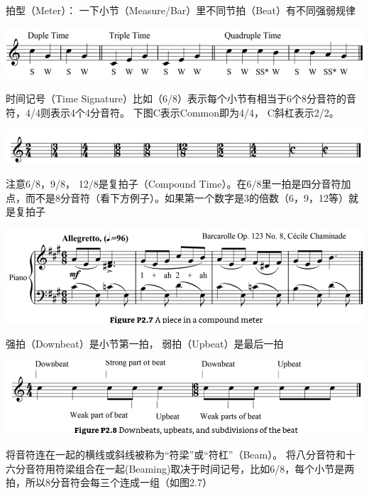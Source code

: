 \documentclass[UTF8]{ctexart}
\begin{document}
拍型（Meter）： 一下小节（Measure/Bar）里不同节拍（Beat）有不同强弱规律
\begin{center}
	\includegraphics[scale=0.5]{meter.png}
\end{center}

时间记号（Time Signature）比如（6/8）表示每个小节有相当于6个8分音符的音符，4/4则表示4个4分音符。
下图C表示Common即为4/4， C斜杠表示2/2。
\begin{center}
	\includegraphics[scale=0.5]{time_signature.png}
\end{center}
 注意6/8，9/8， 12/8是复拍子（Compound Time）。在6/8里一拍是四分音符加点，而不是8分音符（看下方例子）。如果第一个数字是3的倍数（6，9，12等）就是复拍子
\begin{center}
	\includegraphics[scale=0.5]{compound_time.png}
\end{center}

强拍（Downbeat）是小节第一拍， 弱拍（Upbeat）是最后一拍
\begin{center}
	\includegraphics[scale=0.5]{downbeat_upbeat.png}
\end{center}

将音符连在一起的横线或斜线被称为“符梁”或“符杠”（Beam）。 将八分音符和十六分音符用符梁组合在一起(Beaming)取决于时间记号，比如6/8，每个小节是两拍，所以8分音符会每三个连成一组（如图2.7）
\end{document}

